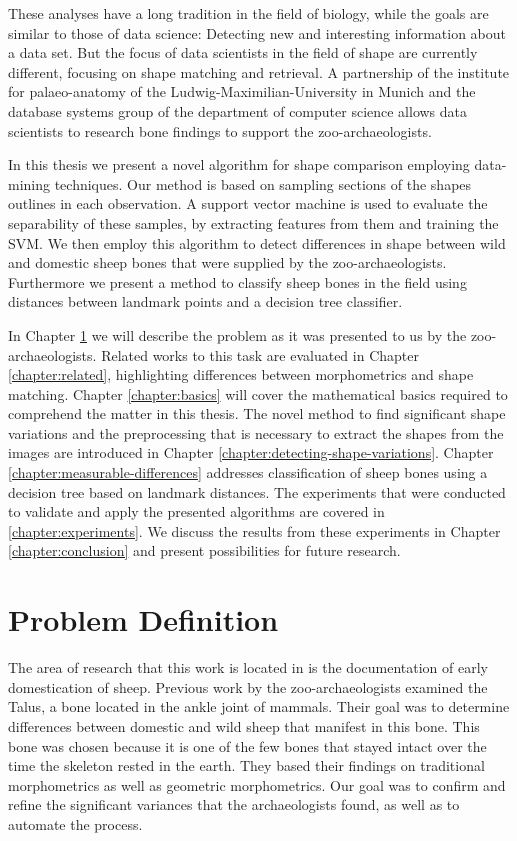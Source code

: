 \documentclass[pdftex,12pt,a4paper]{report}
\begin{document}
These analyses have a long tradition in the field of biology, while the goals are similar to those of data science: Detecting new and interesting information about a data set. But the focus of data scientists in the field of shape are currently different, focusing on shape matching and retrieval. A partnership of the institute for palaeo-anatomy of the Ludwig-Maximilian-University in Munich and the database systems group of the department of computer science allows data scientists to research bone findings to support the zoo-archaeologists.

In this thesis we present a novel algorithm for shape comparison employing data-mining techniques. Our method is based on sampling sections of the shapes outlines in each observation. A support vector machine is used to evaluate the separability of these samples, by extracting features from them and training the SVM. We then employ this algorithm to detect differences in shape between wild and domestic sheep bones that were supplied by the zoo-archaeologists. Furthermore we present a method to classify sheep bones in the field using distances between landmark points and a decision tree classifier. 

In Chapter \ref{chapter:problem-definition} we will describe the problem as it was presented to us by the zoo-archaeologists. Related works to this task are evaluated in Chapter \ref{chapter:related}, highlighting differences between morphometrics and shape matching. Chapter \ref{chapter:basics} will cover the mathematical basics required to comprehend the matter in this thesis. The novel method to find significant shape variations and the preprocessing that is necessary to extract the shapes from the images are introduced in Chapter \ref{chapter:detecting-shape-variations}. Chapter \ref{chapter:measurable-differences} addresses classification of sheep bones using a decision tree based on landmark distances. The experiments that were conducted to validate and apply the presented algorithms are covered in \ref{chapter:experiments}. We discuss the results from these experiments in Chapter \ref{chapter:conclusion} and present possibilities for future research. 

\chapter{Problem Definition}
\label{chapter:problem-definition}

The area of research that this work is located in is the documentation of early domestication of sheep. Previous work by the zoo-archaeologists examined the Talus, a bone located in the ankle joint of mammals. Their goal was to determine differences between domestic and wild sheep that manifest in this bone. This bone was chosen because it is one of the few bones that stayed intact over the time the skeleton rested in the earth. They based their findings on traditional morphometrics as well as geometric morphometrics. Our goal was to confirm and refine the significant variances that the archaeologists found, as well as to automate the process.
\end{document}
